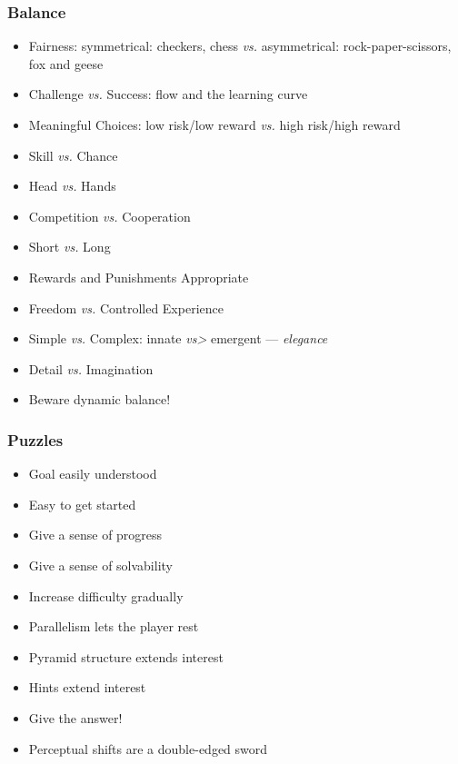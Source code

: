 \documentclass{beamer}
\begin{document}
\begin{frame}
  \frametitle{Balance}

\begin{itemize}
\item Fairness: 
 symmetrical: checkers, chess {\em vs.}
 asymmetrical: rock-paper-scissors, fox and geese
\pause
\item Challenge {\em vs.} Success: flow and the learning curve\pause
\item Meaningful Choices:  low risk/low reward {\em vs.} high
  risk/high reward \pause
\item Skill {\em vs.} Chance \pause
\item Head {\em vs.} Hands \pause
\item Competition {\em vs.} Cooperation \pause
\item Short {\em vs.} Long\pause
\item Rewards and Punishments Appropriate \pause
\item Freedom {\em vs.} Controlled Experience \pause
\item Simple {\em vs.} Complex: innate {\em vs>} emergent --- {\em elegance} \pause
\item Detail {\em vs.} Imagination\pause
\item Beware dynamic balance!
\end{itemize}

\end{frame}

\begin{frame}
  \frametitle{Puzzles}

\begin{itemize}
  \item Goal easily understood
\item Easy to get started
\item Give a sense of progress
\item Give a sense of solvability
\item Increase difficulty gradually
\item Parallelism lets the player rest
\item Pyramid structure extends interest
\item Hints extend interest
\item Give the answer!
\item Perceptual shifts are a double-edged sword
\end{itemize}

\end{frame}
\end{document}
